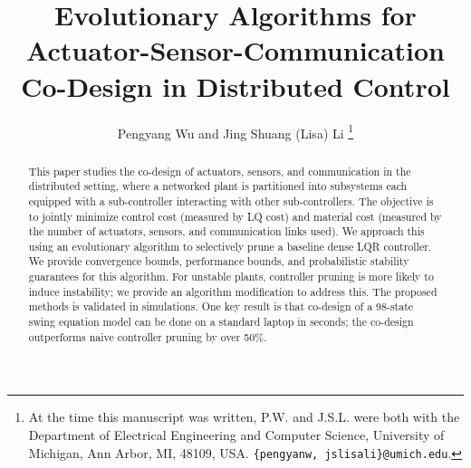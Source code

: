 \documentclass[conference]{IEEEtran}
\begin{document}
\newcommand{\Red}[1]{\textcolor{red}{[{#1}]}}

\title{\LARGE \bf
Evolutionary Algorithms for Actuator-Sensor-Communication Co-Design in Distributed Control
}
\author{Pengyang Wu and Jing Shuang (Lisa) Li%
\thanks{At the time this manuscript was written, P.W. and J.S.L. were both with the Department of Electrical Engineering and Computer Science, University of Michigan, Ann Arbor, MI, 48109, USA.
        {\tt\small \{pengyanw, jslisali\}@umich.edu}.    }%
}

\maketitle

\begin{abstract}
This paper studies the co-design of actuators, sensors, and communication in the distributed setting, where a networked plant is partitioned into subsystems each equipped with a sub-controller interacting with other sub-controllers. The objective is to jointly minimize control cost (measured by LQ cost) and material cost (measured by the number of actuators, sensors, and communication links used). We approach this using an evolutionary algorithm to selectively prune a baseline dense LQR controller. We provide convergence bounds, performance bounds, and probabilistic stability guarantees for this algorithm. For unstable plants, controller pruning is more likely to induce instability; we provide an algorithm modification to address this. The proposed methods is validated in simulations. One key result is that co-design of a 98-state swing equation model can be done on a standard laptop in seconds; the co-design outperforms naive controller pruning by over 50\%.
\end{abstract}
\end{document}
